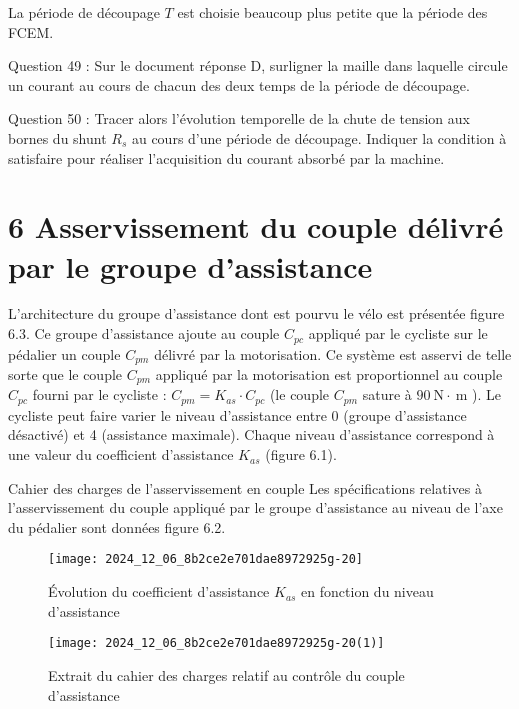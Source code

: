 La période de découpage \(T\) est choisie beaucoup plus petite que la période des FCEM.

Question 49 : Sur le document réponse D, surligner la maille dans laquelle circule un courant au cours de chacun des deux temps de la période de découpage.

Question 50 : Tracer alors l'évolution temporelle de la chute de tension aux bornes du shunt \(R_{s}\) au cours d'une période de découpage. Indiquer la condition à satisfaire pour réaliser l'acquisition du courant absorbé par la machine.

\section{6 Asservissement du couple délivré par le groupe d'assistance}
L'architecture du groupe d'assistance dont est pourvu le vélo est présentée figure 6.3. Ce groupe d'assistance ajoute au couple \(C_{p c}\) appliqué par le cycliste sur le pédalier un couple \(C_{p m}\) délivré par la motorisation. Ce système est asservi de telle sorte que le couple \(C_{p m}\) appliqué par la motorisation est proportionnel au couple \(C_{p c}\) fourni par le cycliste : \(C_{p m}=K_{a s} \cdot C_{p c}\) (le couple \(C_{p m}\) sature à \(90 \mathrm{~N} \cdot \mathrm{~m}\) ). Le cycliste peut faire varier le niveau d'assistance entre 0 (groupe d'assistance désactivé) et 4 (assistance maximale). Chaque niveau d'assistance correspond à une valeur du coefficient d'assistance \(K_{a s}\) (figure 6.1).

Cahier des charges de l'asservissement en couple Les spécifications relatives à l'asservissement du couple appliqué par le groupe d'assistance au niveau de l'axe du pédalier sont données figure 6.2.\\

\begin{figure}[!htb]
\begin{center}
\texttt{[image: 2024\_12\_06\_8b2ce2e701dae8972925g-20]}
\caption{Évolution du coefficient d'assistance \(K_{a s}\) en fonction du niveau d'assistance\\ \label{fig14}}
\end{center}
\end{figure}

\begin{figure}[!htb]
\begin{center}
\texttt{[image: 2024\_12\_06\_8b2ce2e701dae8972925g-20(1)]}
\caption{Extrait du cahier des charges relatif au contrôle du couple d'assistance \label{fig15}}
\end{center}
\end{figure}


